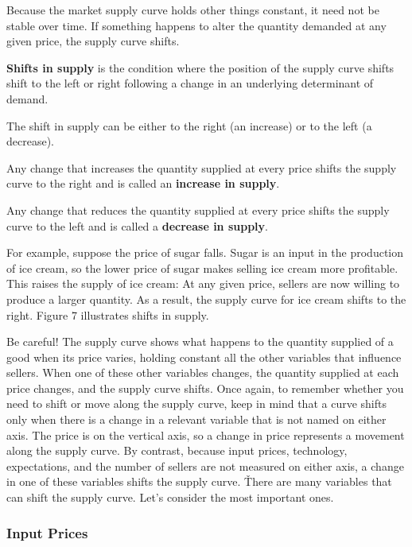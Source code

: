 Because the market supply curve holds other things constant, it need not be stable over time. If something happens to
alter the quantity demanded at any given price, the supply curve shifts.

\textbf{Shifts in supply} is the condition where the position of the supply curve shifts shift to the left or right
following a change in an underlying determinant of demand.
\ed

The shift in supply can be either to the right (an increase) or to the left (a decrease).

Any change that increases the quantity supplied at every price shifts the supply curve to the right and is called an
\textbf{increase in supply}.
\ed

Any change that reduces the quantity supplied at every price shifts the supply curve to the left and is called a
\textbf{decrease in supply}.
\ed

\be
{}

For example, suppose the price of sugar falls. Sugar is an input in the production of ice cream, so the lower price
of sugar makes selling ice cream more profitable. This raises the supply of ice cream: At any given price, sellers
are now willing to produce a larger quantity. As a result, the supply curve for ice cream shifts to the right. Figure
7 illustrates shifts in supply.
\ee

Be careful! The supply curve shows what happens to the quantity supplied of a good when its price varies, holding
constant all the other variables that influence sellers. When one of these other variables changes, the quantity
supplied at each price changes, and the supply curve shifts. Once again, to remember whether you need to shift or
move along the supply curve, keep in mind that a curve shifts only when there is a change in a relevant variable that
is not named on either axis. The price is on the vertical axis, so a change in price represents a movement along the
supply curve. By contrast, because input prices, technology, expectations, and the number of sellers are not measured
on either axis, a change in one of these variables shifts the supply curve. \v

There are many variables that can shift the supply curve. Let's consider the most important ones.

\subsubsection*{Input Prices}

